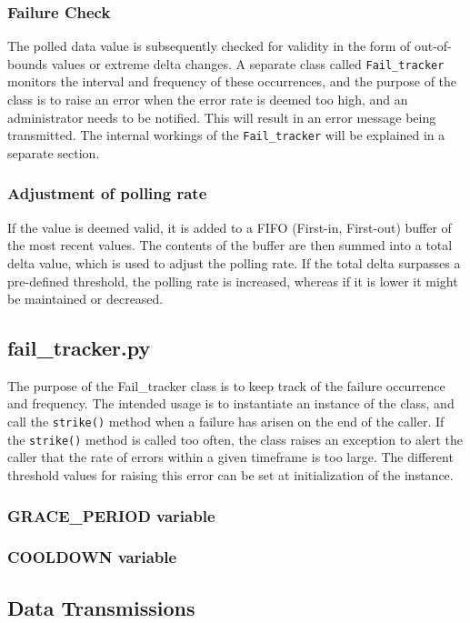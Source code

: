 \subsubsection{Failure Check}
The polled data value is subsequently checked for validity in the form of out-of-bounds values or extreme delta changes. A separate class called \lstinline{Fail_tracker} monitors the interval and frequency of these occurrences, and the purpose of the class is to raise an error when the error rate is deemed too high, and an administrator needs to be notified. This will result in an error message being transmitted. The internal workings of the \lstinline{Fail_tracker} will be explained in a separate section.

\subsubsection{Adjustment of polling rate}
If the value is deemed valid, it is added to a FIFO (First-in, First-out) buffer of the most recent values. The contents of the buffer are then summed into a total delta value, which is used to adjust the polling rate. If the total delta surpasses a pre-defined threshold, the polling rate is increased, whereas if it is lower it might be maintained or decreased.


\subsection{fail\_tracker.py}
The purpose of the Fail\_tracker class is to keep track of the failure occurrence and frequency. The intended usage is to instantiate an instance of the class, and call the \lstinline{strike()} method when a failure has arisen on the end of the caller. If the \lstinline{strike()} method is called too often, the class raises an exception to alert the caller that the rate of errors within a given timeframe is too large. The different threshold values for raising this error can be set at initialization of the instance.

\subsubsection{GRACE\_PERIOD variable}

\subsubsection{COOLDOWN variable}

\subsection{Data Transmissions}

